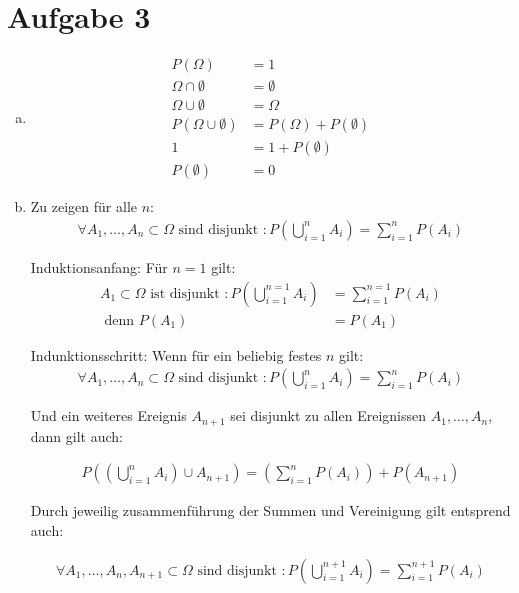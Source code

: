 \documentclass[parskip=half,a4paper]{scrartcl}
\begin{document}
\section*{Aufgabe 3}

\begin{enumerate}[(a)]
\item
\begin{align}
    P(\Omega) &= 1\\
\Omega \cap \emptyset &= \emptyset\\
\Omega \cup \emptyset &= \Omega\\
P(\Omega \cup \emptyset) &= P(\Omega) + P(\emptyset)\\
1 &= 1 + P(\emptyset)\\
P(\emptyset) &= 0
\end{align}

\item

Zu zeigen für alle $n$:
\begin{align}
\forall A_1,\dots,A_n \subset \Omega \text{ sind disjunkt }:
P(\bigcup\limits_{i=1}^{n} A_i) = \sum\limits_{i=1}^{n} P(A_i)
\end{align}

Induktionsanfang: Für $n = 1$ gilt:
\begin{align}
A_1 \subset \Omega \text{ ist disjunkt }
:
P(\bigcup\limits_{i=1}^{n=1} A_i) &= \sum\limits_{i=1}^{n=1} P(A_i)\\
\text{ denn } P(A_1) &= P(A_1)
\end{align}


Indunktionsschritt: Wenn für ein beliebig festes $n$ gilt:
\begin{align}
\forall A_1,\dots,A_n \subset \Omega \text{ sind disjunkt }:
P(\bigcup\limits_{i=1}^{n} A_i) = \sum\limits_{i=1}^{n} P(A_i)
\end{align}

Und ein weiteres Ereignis $A_{n+1}$ sei disjunkt zu allen Ereignissen $A_1,\dots,A_n$, dann gilt auch:

\begin{align}
P((\bigcup\limits_{i=1}^{n} A_i) \cup A_{n+1}) = (\sum\limits_{i=1}^{n} P(A_i)) + P(A_{n+1})
\end{align}

Durch jeweilig zusammenführung der Summen und Vereinigung gilt entsprend auch:

\begin{align}
\forall A_1,\dots,A_n,A_{n+1} \subset \Omega \text{ sind disjunkt }:
P(\bigcup\limits_{i=1}^{n+1} A_i) = \sum\limits_{i=1}^{n+1} P(A_i)
\end{align}


\end{enumerate}
\end{document}
